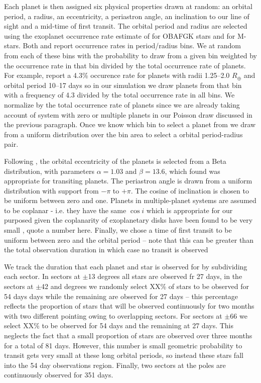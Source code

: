 \documentclass[iop,apj]{emulateapj}
\begin{document}
Each planet is then assigned six physical properties drawn at random: an orbital period, a radius, an eccentricity, a periastron angle, an inclination to our line of sight and a mid-time of first transit. The orbital period and radius are selected using the exoplanet occurrence rate estimate of \citet{fressin13} for OBAFGK stars and \citet{dressin15} for M-stars. Both \citet{fressin13} and \citet{dressin15} report occurrence rates in period/radius bins. We at random from each of these bins with the probability to draw from a given bin weighted by the occurrence rate in that bin divided by the total occurrence rate of planets. For example, \citet{dressin15} report a 4.3\% occurence rate for planets with radii 1.25--2.0 $R_\oplus$ and orbital period 10--17 days so in our simulation we draw planets from that bin with a frequency of 4.3 divided by the total occurrence rate in all bins. We normalize by the total occurrence rate of planets since we are already taking account of system with zero or multiple planets in our Poisson draw discussed in the previous paragraph. Once we know which bin to select a planet from we draw from a uniform distribution over the bin area to select a orbital period-radius pair.

Following \citet{kipping14}, the orbital eccentricity of the planets is selected from a Beta distribution, with parameters $\alpha=1.03$ and $\beta=13.6$, which \citet{vaneylen15} found was appropriate for transiting planets. The periastron angle is drawn from a uniform distribution with support from $-\pi$ to $+\pi$. The cosine of inclination is chosen to be uniform between zero and one. Planets in multiple-planet systems are assumed to be coplanar - i.e. they have the same $\cos{i}$ which is appropriate for our purposed given the coplanarity of exoplanetary disks have been found to be very small \citep{someone}, quote a number here. Finally, we chose a time of first transit to be uniform between zero and the orbital period -- note that this can be greater than the total observation duration in which case no transit is observed

We track the duration that each planet and star is observed for by subdividing each sector. In sectors at $\pm$13
 degrees all stars are observed fr 27 days, in the sectors at $\pm$42 and degrees we randomly select XX\% of stars to be observed for 54 days days while the remaining are observed for 27 days -- this percentage reflects the proportion of stars that will be observed continuously for two months with two different pointing owing to overlapping sectors. For sectors at $\pm$66 we select XX\% to be observed for 54 days and the remaining at 27 days. This neglects the fact that a small proportion of stars are observed over three months for a total of 81 days. However, this number is small geometric probability to transit gets very small at these long orbital periods, so instead these stars fall into the 54 day observations region. Finally, two sectors at the poles are continuously observed for 351 days.
\end{document}
